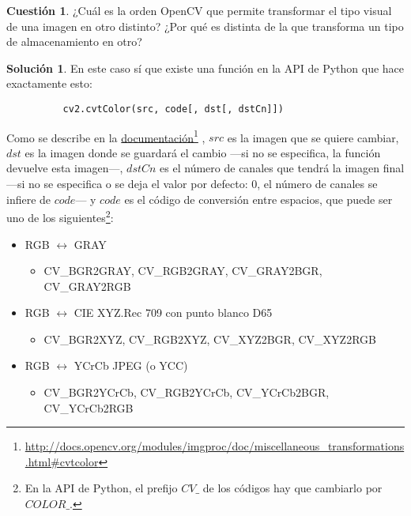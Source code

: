 \documentclass[a4paper, 11pt]{article}
\newcommand\fnurl[2]{%
  \href{#2}{#1}\footnote{\url{#2}}%
}
\theoremstyle{definition}
\newtheorem{cuestion}{Cuestión}
\newtheorem*{solucion}{Solución}
\begin{document}
  \begin{cuestion}
      ¿Cuál es la orden OpenCV que permite transformar el tipo visual de una imagen en otro distinto? ¿Por qué es distinta de la que transforma un tipo de almacenamiento en otro?
  \end{cuestion}

  \begin{solucion}
      En este caso sí que existe una función en la API de Python que hace exactamente esto:

      \begin{lstlisting}
          cv2.cvtColor(src, code[, dst[, dstCn]])
      \end{lstlisting}

      Como se describe en la \fnurl{documentación}{http://docs.opencv.org/modules/imgproc/doc/miscellaneous_transformations.html\#cvtcolor}, $src$ es la imagen que se quiere cambiar, $dst$ es la imagen donde se guardará el cambio ---si no se especifica, la función devuelve esta imagen---, $dstCn$ es el número de canales que tendrá la imagen final ---si no se especifica o se deja el valor por defecto: 0, el número de canales se infiere de $code$--- y $code$ es el código de conversión entre espacios, que puede ser uno de los siguientes\footnote{En la API de Python, el prefijo $CV\_$ de los códigos hay que cambiarlo por $COLOR\_$.}:

      \begin{itemize}
          \item RGB $\leftrightarrow$ GRAY
              \begin{itemize}
                  \item CV\_BGR2GRAY, CV\_RGB2GRAY, CV\_GRAY2BGR, CV\_GRAY2RGB
              \end{itemize}


          \item RGB $\leftrightarrow$ CIE XYZ.Rec 709 con punto blanco D65
              \begin{itemize}
                  \item CV\_BGR2XYZ, CV\_RGB2XYZ, CV\_XYZ2BGR, CV\_XYZ2RGB
              \end{itemize}

          \item RGB $\leftrightarrow$ YCrCb JPEG (o YCC)
              \begin{itemize}
                  \item CV\_BGR2YCrCb, CV\_RGB2YCrCb, CV\_YCrCb2BGR, CV\_YCrCb2RGB
              \end{itemize}


\end{itemize}
\end{solucion}
\end{document}
